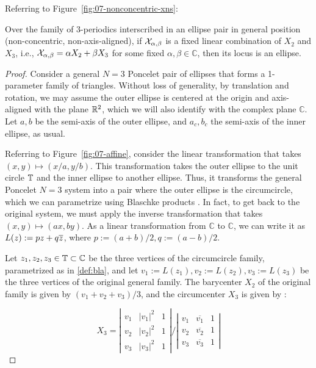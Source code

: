 
Referring to Figure~\ref{fig:07-nonconcentric-xns}:

\begin{theorem}
Over the family of 3-periodics interscribed in an ellipse pair in general position (non-concentric, non-axis-aligned),
if $\mathcal{X}_{\alpha,\beta}$ is a fixed linear combination of $X_2$ and $X_3$, i.e., $\mathcal{X}_{\alpha,\beta}=\alpha X_2+\beta X_3$ for some fixed $\alpha,\beta\in\mathbb{C}$, then its locus is an ellipse. 
\label{thm:07-ellipse-locus}
\end{theorem}

\begin{proof}
Consider a general $N=3$ Poncelet pair of ellipses that forms a 1-parameter family of triangles. Without loss of generality, by translation and rotation, we may assume the outer ellipse is centered at the origin and axis-aligned with the plane $\mathbb{R}^2$, which we will also identify with the complex plane $\mathbb{C}$. Let $a,b$ be the semi-axis of the outer ellipse, and $a_c,b_c$ the semi-axis of the inner ellipse, as usual. 

Referring to Figure~\ref{fig:07-affine}, consider the linear transformation that takes $(x,y)\mapsto(x/a,y/b)$. This transformation takes the outer ellipse to the unit circle $\mathbb{T}$ and the inner ellipse to another ellipse. Thus, it transforms the general Poncelet $N=3$ system into a pair where the outer ellipse is the circumcircle, which we can parametrize using Blaschke products \cite{daepp-2019}. In fact, to get back to the original system, we must apply the inverse transformation that takes $(x,y)\mapsto(a x,b y)$. As a linear transformation from $\mathbb{C}$ to $\mathbb{C}$, we can write it as $L(z):=p z+q \overline{z}$, where $p:=(a+b)/2, q:=(a-b)/2$.

Let $z_1,z_2,z_3\in\mathbb{T}\subset\mathbb{C}$ be the three vertices of the circumcircle family, parametrized as in \cref{def:bla}, and let $v_1:=L(z_1),v_2:=L(z_2),v_3:=L(z_3)$ be the three vertices of the original general family. The barycenter $X_2$ of the original family is given by $(v_1+v_2+v_3)/3$, and the circumcenter $X_3$ is given by \cite{stackexchange-x3a}:

\[
    X_3=\left|
        \begin{array}{ccc}
          v_1 & |v_1|^2 & 1 \\
          v_2 & |v_2|^2 & 1 \\
          v_3 & |v_3|^2 & 1
        \end{array}
      \right| \Bigg/
     \left|
        \begin{array}{ccc}
          v_1 & \overline{v_1} & 1 \\
          v_2 & \overline{v_2} & 1 \\
          v_3 & \overline{v_3} & 1
        \end{array}
      \right|
\]


\end{proof}
